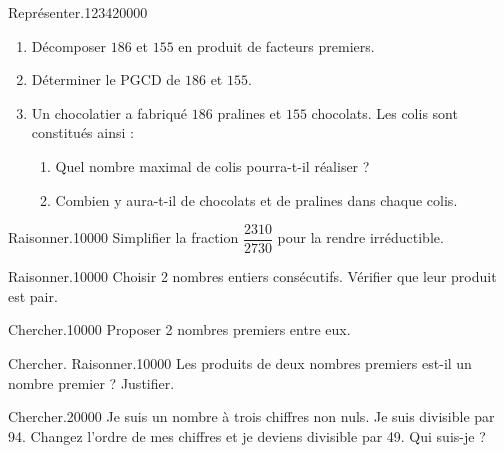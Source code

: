 \begin{pageParcoursu} 



 
\begin{ExoCu}{Représenter.}{1234}{2}{0}{0}{0}{0}

\begin{enumerate}
\item Décomposer $186$ et $155$ en produit de facteurs premiers. 
\item Déterminer le PGCD de $186$ et $155$. 
\item Un chocolatier a fabriqué $186$ pralines et $155$ chocolats.
Les colis sont constitués ainsi :
\begin{enumerate}
\item Quel nombre maximal de colis pourra-t-il réaliser ?  
\item Combien y aura-t-il de chocolats et de pralines dans chaque colis.   
\end{enumerate}
\end{enumerate}
  
\end{ExoCu}


\begin{ExoCuN}{Raisonner.}{1}{0}{0}{0}{0}
Simplifier la fraction $\dfrac{2310}{2730}$ pour la rendre irréductible. 
\end{ExoCuN}


\begin{ExoCuN}{Raisonner.}{1}{0}{0}{0}{0}
Choisir 2 nombres entiers consécutifs. Vérifier que leur produit est pair. 
\end{ExoCuN}

\begin{ExoCuN}{Chercher.}{1}{0}{0}{0}{0}
Proposer 2 nombres premiers entre eux. 
\end{ExoCuN}

\begin{ExoCuN}{Chercher. Raisonner.}{1}{0}{0}{0}{0}
Les produits de deux nombres premiers est-il un nombre premier ? Justifier. 
\end{ExoCuN}


\begin{ExoCuN}{Chercher.}{2}{0}{0}{0}{0} 
Je suis un nombre à trois chiffres non nuls. Je suis divisible par 94. Changez l'ordre de mes chiffres et je deviens divisible par 49.
Qui suis-je ?   
\end{ExoCuN}


\end{pageParcoursu} 
 

